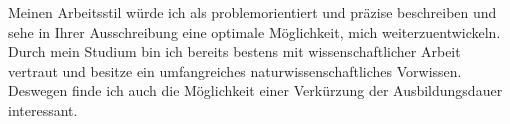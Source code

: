 \documentclass[11pt,a4paper,roman]{moderncv}
\begin{document}
%
Meinen Arbeitsstil würde ich als problemorientiert und präzise beschreiben und sehe in Ihrer Ausschreibung eine optimale Möglichkeit, mich weiterzuentwickeln. Durch mein Studium bin ich bereits bestens mit wissenschaftlicher Arbeit vertraut und besitze ein umfangreiches naturwissenschaftliches Vorwissen.
Deswegen finde ich auch die Möglichkeit einer Verkürzung der Ausbildungsdauer interessant.

\vspace{1.7cm}


\makeletterclosing
\end{document}
